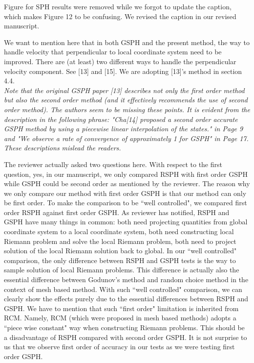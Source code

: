 \documentclass[10pt,a4paper]{article}
\begin{document}
Figure for SPH results were removed while we forgot to update the caption, which makes Figure 12 to be confusing. We revised the caption in our revised manuscript. 

We want to mention here that in both GSPH and the present method, the way to handle velocity that perpendicular to local coordinate system need to be improved. There are (at least) two different ways to handle the perpendicular velocity component. See [13] and [15]. We are adopting [13]'s method in section 4.4. 
\\[3pt]


\textit{Note that the original GSPH paper [13] describes not only the first order method but also the second order method (and it effectively recommends the use of second order method). The authors seem to be missing these points. It is evident from the description in the following phrase: "Cha[14] proposed a second order accurate GSPH method by using a piecewise linear interpolation of the states." in Page 9 and "We observe a rate of convergence of approximately 1 for GSPH" in Page 17. These descriptions mislead the readers.}

The reviewer actually asked two questions here. 
With respect to the first question, yes, in our manuscript, we only compared RSPH with first order GSPH while GSPH could be second order as mentioned by the reviewer. The reason why we only compare our method with first order GSPH is that our method can only be first order. To make the comparison to be ``well controlled", we compared first order RSPH against first order GSPH. As reviewer has notified, RSPH and GSPH have many things in common: both need projecting quantities from global coordinate system to a local coordinate system, both need constructing local Riemann problem and solve the local Riemann problem, both need to project solution of the local Riemann solution back to global. In our ``well controlled" comparison, the only difference between RSPH and GSPH tests is the way to sample solution of local Riemann problems. This difference is actually also the essential difference between Godunov's method and random choice method in the context of mesh based method. With such ``well controlled" comparison, we can clearly show the effects purely due to the essential differences between RSPH and GSPH. We have to mention that such ``first order" limitation is inherited from RCM. Namely, RCM (which were proposed in mesh based methods) adopts a ``piece wise constant" way when constructing Riemann problems. This should be a disadvantage of RSPH compared with second order GSPH.
It is not surprise to us that we observe first order of accuracy in our tests as we were testing first order GSPH.
\end{document}
